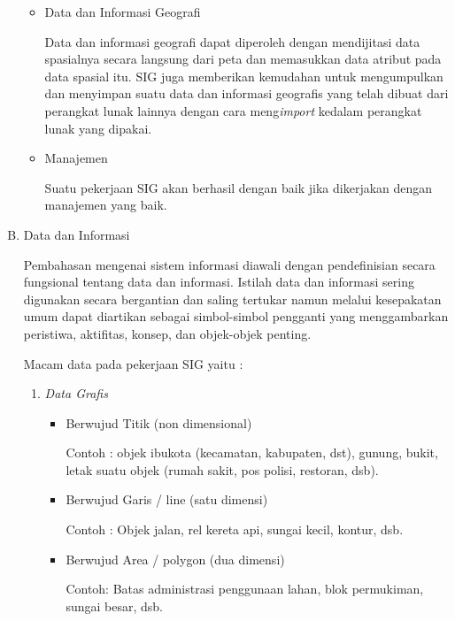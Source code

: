 \begin{enumerate}[A.]
\begin{itemize}
\item Data dan Informasi Geografi

Data dan informasi geografi dapat diperoleh dengan mendijitasi data spasialnya secara langsung dari peta dan memasukkan data atribut pada data spasial itu. SIG juga memberikan kemudahan untuk mengumpulkan dan menyimpan suatu data dan informasi geografis yang telah dibuat dari perangkat lunak lainnya dengan cara meng\textit{import} kedalam perangkat lunak yang dipakai.

\item Manajemen

Suatu pekerjaan SIG akan berhasil dengan baik jika dikerjakan dengan manajemen yang baik.

\end{itemize}

\item{Data dan Informasi}

Pembahasan mengenai sistem informasi diawali dengan pendefinisian secara fungsional tentang data dan informasi. Istilah data dan informasi sering digunakan secara bergantian dan saling tertukar namun melalui kesepakatan umum dapat diartikan sebagai simbol-simbol pengganti yang menggambarkan peristiwa, aktifitas, konsep, dan objek-objek penting.

Macam data pada pekerjaan SIG yaitu :

\begin{enumerate}[\itshape 1.]

  \item \textit{Data Grafis}
    
    \begin{itemize}
    
      \item Berwujud Titik (non dimensional)

    Contoh : objek ibukota (kecamatan, kabupaten, dst), gunung, bukit, letak suatu objek (rumah sakit, pos polisi, restoran, dsb).

      \item Berwujud Garis / line (satu dimensi)

    Contoh : Objek jalan, rel kereta api, sungai kecil, kontur, dsb.

      \item Berwujud Area / polygon (dua dimensi)

    Contoh: Batas administrasi penggunaan lahan, blok permukiman, sungai besar, dsb.

    \end{itemize}


\end{enumerate}
\end{enumerate}
